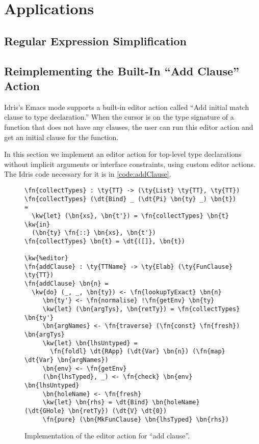 \section{Applications} \label{sec:applications}

\subsection{Regular Expression Simplification}


\subsection{Reimplementing the Built-In ``Add Clause'' Action}\label{sec:addClause}

Idris's Emacs mode supports a built-in editor action called ``Add initial match
clause to type declaration.'' When the cursor is on the type signature of a
function that does not have any clauses, the user can run this editor action
and get an initial clause for the function.

In this section we implement an editor action for top-level type declarations
without implicit arguments or interface constraints, using custom editor actions.
The Idris code necessary for it is in \autoref{code:addClause}.

\begin{figure}[ht]
\begin{Verbatim}[framesep=2mm, label=\footnotesize{\normalfont{Idris}}, labelposition=topline]
\fn{collectTypes} : \ty{TT} -> (\ty{List} \ty{TT}, \ty{TT})
\fn{collectTypes} (\dt{Bind} _ (\dt{Pi} \bn{ty} _) \bn{t}) =
  \kw{let} (\bn{xs}, \bn{t'}) = \fn{collectTypes} \bn{t} \kw{in}
  (\bn{ty} \fn{::} \bn{xs}, \bn{t'})
\fn{collectTypes} \bn{t} = \dt{([]}, \bn{t})

\kw{%editor}
\fn{addClause} : \ty{TTName} -> \ty{Elab} (\ty{FunClause} \ty{TT})
\fn{addClause} \bn{n} =
  \kw{do} (_, _, \bn{ty}) <- \fn{lookupTyExact} \bn{n}
     \bn{ty'} <- \fn{normalise} !\fn{getEnv} \bn{ty}
     \kw{let} (\bn{argTys}, \bn{retTy}) = \fn{collectTypes} \bn{ty'}
     \bn{argNames} <- \fn{traverse} (\fn{const} \fn{fresh}) \bn{argTys}
     \kw{let} \bn{lhsUntyped} =
       \fn{foldl} \dt{RApp} (\dt{Var} \bn{n}) (\fn{map} \dt{Var} \bn{argNames})
     \bn{env} <- \fn{getEnv}
     (\bn{lhsTyped}, _) <- \fn{check} \bn{env} \bn{lhsUntyped}
     \bn{holeName} <- \fn{fresh}
     \kw{let} \bn{rhs} = \dt{Bind} \bn{holeName} (\dt{GHole} \bn{retTy}) (\dt{V} \dt{0})
     \fn{pure} (\bn{MkFunClause} \bn{lhsTyped} \bn{rhs})
\end{Verbatim}
\caption{Implementation of the editor action for ``add clause''.}
\label{code:addClause}
\end{figure}

